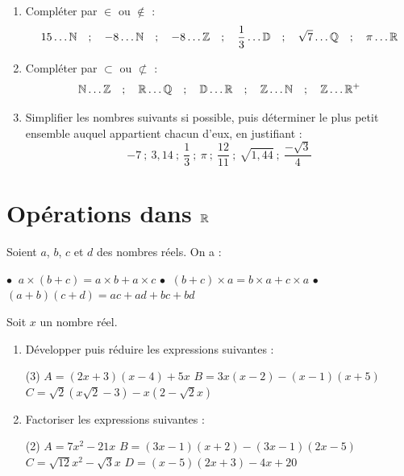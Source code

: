 \documentclass[10pt, a4paper]{article}
\begin{document}
\begin{Application}[][20 min]
\begin{enumerate}
    \item Compléter par  $\in$ ou $\notin$ :
    $$15 \dots \mathbb{N} \quad ; \quad -8 \dots \mathbb{N} \quad ; \quad -8 \dots \mathbb{Z} \quad ; \quad \dfrac{1}{3} \dots \mathbb{D} \quad ; \quad \sqrt{7} \dots \mathbb{Q} \quad ; \quad \pi \dots \mathbb{R}$$

    \item Compléter par  $\subset$ ou  $\not\subset$ :
    $$\mathbb{N} \dots \mathbb{Z} \quad ; \quad \mathbb{R} \dots \mathbb{Q} \quad ; \quad \mathbb{D} \dots \mathbb{R} \quad ; \quad \mathbb{Z} \dots \mathbb{N} \quad ; \quad 
    \mathbb{Z} \dots \mathbb{R}^+    $$

\item Simplifier les nombres suivants si possible, puis déterminer le plus petit ensemble auquel appartient chacun d'eux, en justifiant :
$$ -7 ~;~ 3{,}14 ~;~ \frac{1}{3} ~;~ \pi ~;~ \frac{12}{11} ~;~ \sqrt{1{,}44} ~;~ \frac{-\sqrt{3}}{4} $$
\end{enumerate}
\end{Application}

\section{Opérations dans $\mathbb{R}$ }

\begin{Propriete}

Soient $a$, $b$, $c$  et $d$ des nombres réels. On a :
\vspace{0.2cm}

    $\bullet~$  $a \times (b+c) = a \times b + a \times c$ \hfill
    $\bullet~$  $(b+c) \times a = b \times a + c \times a$ \hfill
    $\bullet~$  $(a+b)(c+d) = ac + ad + bc + bd$
\end{Propriete}

\begin{Application}[][20 min]
Soit $x$ un nombre réel.
\begin{enumerate}
    \item Développer puis réduire les expressions suivantes :
    \begin{tasks}[label=$\bullet$, label-width=5pt, item-indent=15pt](3)
        \task $A = (2x + 3)(x - 4) + 5x$
        \task $B = 3x(x - 2) - (x - 1)(x + 5)$
        \task $C = \sqrt{2}(x\sqrt{2} - 3) - x(2 - \sqrt{2}x)$
    \end{tasks}

    \item Factoriser les expressions suivantes :
    \begin{tasks}[label=$\bullet$, label-width=5pt, item-indent=15pt](2)
        \task $A = 7x^2 - 21x$
        \task $B = (3x - 1)(x + 2) - (3x - 1)(2x - 5)$
        \task $C = \sqrt{12}x^2 - \sqrt{3}x$
        \task $D = (x - 5)(2x + 3) - 4x + 20$
    \end{tasks}
\end{enumerate}
\end{Application}
\end{document}
